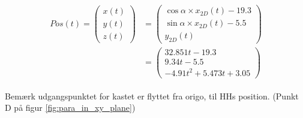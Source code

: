 \begin{align}
\begin{split}
Pos(t) = \left( \begin{array}{c}
	x(t) \\
	y(t) \\
	z(t)
	\end{array}
	\right)
	&= \left( \begin{array}{c}
	\cos \alpha \times x_{2D}(t) - 19.3 \\
	\sin \alpha \times x_{2D}(t) - 5.5 \\
	y_{2D}(t)
	\end{array}
	\right) \\
	&= \left( \begin{array}{c}
	32.851 t - 19.3 \\
	9.34 t - 5.5 \\
	- 4.91 t^2 + 5.473 t + 3.05
	\end{array}
	\right)
\label{eq:pf:vektorparabel3d}
\end{split}
\end{align}


Bemærk udgangspunktet for kastet er flyttet fra origo, til HHs position. (Punkt D på figur \ref{fig:para_in_xy_plane})
